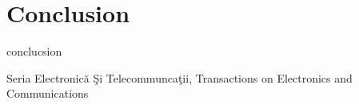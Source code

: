\chapter{Conclusion}
conclucsion

Seria Electronic\u{a} \c{S}i Telecommunca\c{t}ii, Transactions on Electronics and Communications
